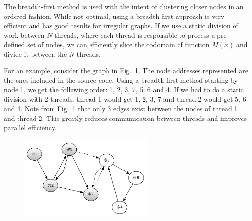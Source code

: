 The breadth-first method is used with the intent of clustering closer nodes in
an ordered fashion.  While not optimal, using a breadth-first approach is very
efficient and has good results for irregular graphs. If we use a static division
of work between $N$ threads, where each thread is responsible to process a
pre-defined set of nodes, we can efficiently slice the codomain of function
$M(x)$ and divide it between the $N$ threads.

For an example, consider the graph in Fig.~\ref{fig:compiler:topology1}. The
node addresses represented are the ones included in the source code. Using a
breadth-first method starting by node 1, we get the following order: 1, 2, 3, 7,
5, 6 and 4. If we had to do a static division with 2 threads, thread 1 would get
1, 2, 3, 7 and thread 2 would get 5, 6 and 4. Note from
Fig.~\ref{fig:compiler:topology1} that only 3 edges exist between the nodes of
thread 1 and thread 2. This greatly reduces communication between threads and
improves parallel efficiency.

\begin{figure}[ht]
  \centering
  \includegraphics[width=0.6\textwidth]{figures/compiler/topology1.pdf}
  \label{fig:compiler:topology1}
\end{figure}
\fi
